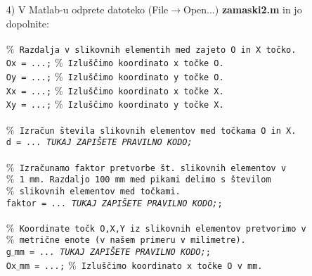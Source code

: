 \begin{enumerate}
\item[4)] V Matlab-u odprete datoteko
(File$\longrightarrow$Open...) \textbf{zamaski2.m} in jo dopolnite:
\\ %
\\ %
\small %
\textcolor[rgb]{0.50,0.50,0.50}{\texttt{$\%$ Razdalja v slikovnih elementih med zajeto O in X točko.}} \\%
\texttt{Ox = \emph{...};} \hspace{1cm} \textcolor[rgb]{0.50,0.50,0.50}{\texttt{$\%$ Izluščimo koordinato x točke O.}} \\%
\texttt{Oy = \emph{...};} \hspace{1cm} \textcolor[rgb]{0.50,0.50,0.50}{\texttt{$\%$ Izluščimo koordinato y točke O.}} \\%
\texttt{Xx = \emph{...};} \hspace{1cm} \textcolor[rgb]{0.50,0.50,0.50}{\texttt{$\%$ Izluščimo koordinato x točke X.}} \\%
\texttt{Xy = \emph{...};} \hspace{1cm} \textcolor[rgb]{0.50,0.50,0.50}{\texttt{$\%$ Izluščimo koordinato y točke X.}} \\%
\\
\textcolor[rgb]{0.50,0.50,0.50}{\texttt{$\%$ Izračun števila slikovnih elementov med točkama O in X.}} \\%
\texttt{d = \emph{... TUKAJ ZAPIŠETE PRAVILNO KODO;}}\\%
\\
\textcolor[rgb]{0.50,0.50,0.50}{\texttt{$\%$ Izračunamo faktor pretvorbe št. slikovnih elementov v }} \\%
\textcolor[rgb]{0.50,0.50,0.50}{\texttt{$\%$ 1 mm. Razdaljo 100 mm med pikami delimo s številom}} \\%
\textcolor[rgb]{0.50,0.50,0.50}{\texttt{$\%$ slikovnih elementov med točkami.}} \\%
\texttt{faktor = \emph{... TUKAJ ZAPIŠETE PRAVILNO KODO;};} \\ %
\\
\textcolor[rgb]{0.50,0.50,0.50}{\texttt{$\%$ Koordinate točk O,X,Y iz slikovnih elementov pretvorimo v}} \\%
\textcolor[rgb]{0.50,0.50,0.50}{\texttt{$\%$ metrične enote (v našem primeru v milimetre).}} \\%
\texttt{g$\_$mm = \emph{... TUKAJ ZAPIŠETE PRAVILNO KODO;};} \\ %
\texttt{Ox$\_$mm = \emph{...};} \hspace{0.6cm} \textcolor[rgb]{0.50,0.50,0.50}{\texttt{$\%$ Izluščimo koordinato x točke O v mm.}} \\%

\end{enumerate}
